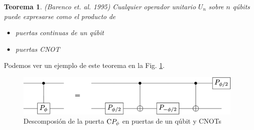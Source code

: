 \documentclass[a4paper,11pt]{book} %
\newtheorem{teorema_contador}{Teorema}
\newcommand{\Teorema}[1]{
		\begin{mybox_gray2}{}
			\begin{teorema_contador}
				 #1 
			\end{teorema_contador} 
		\end{mybox_gray2}
	}
\numberwithin{equation}{chapter}
\newcommand{\cg}[1]{{\rm C}#1}
\begin{document}
	\Teorema{ \textit{(Barenco et. al. 1995)} 
	Cualquier operador unitario $U_n$ sobre $n$ qúbits puede expresarse como el 
	producto de 
	\begin{itemize}
		\item puertas continuas de \textit{un qúbit}
		\item puertas CNOT
	\end{itemize}
	}

Podemos ver un ejemplo de este teorema en la Fig. \ref{Fig_elementos_Equiv_Phase}.
	\begin{figure}[H]
	\centering 
	\includegraphics[width=0.60\linewidth]{Figuras/Fig_elementos_Equiv_Phase.png}
	\caption{Descomposión de la puerta $\cg{P_\phi}$ en puertas de un qúbit y CNOTs}
	\label{Fig_elementos_Equiv_Phase}
	\end{figure}
\end{document}
